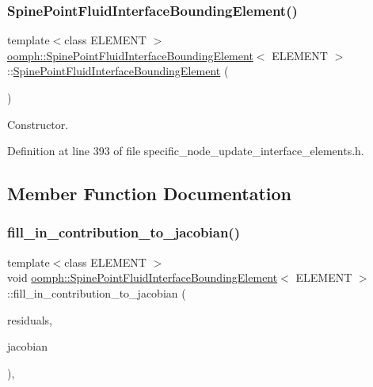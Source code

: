 \subsubsection{\texorpdfstring{Spine\+Point\+Fluid\+Interface\+Bounding\+Element()}{SpinePointFluidInterfaceBoundingElement()}}
{\footnotesize\ttfamily template$<$class E\+L\+E\+M\+E\+NT $>$ \\
\hyperlink{classoomph_1_1SpinePointFluidInterfaceBoundingElement}{oomph\+::\+Spine\+Point\+Fluid\+Interface\+Bounding\+Element}$<$ E\+L\+E\+M\+E\+NT $>$\+::\hyperlink{classoomph_1_1SpinePointFluidInterfaceBoundingElement}{Spine\+Point\+Fluid\+Interface\+Bounding\+Element} (\begin{DoxyParamCaption}{ }\end{DoxyParamCaption})\hspace{0.3cm}{\ttfamily [inline]}}



Constructor. 



Definition at line 393 of file specific\+\_\+node\+\_\+update\+\_\+interface\+\_\+elements.\+h.



\subsection{Member Function Documentation}
\mbox{\label{classoomph_1_1SpinePointFluidInterfaceBoundingElement_afe714a2a2b9f741558376cc144e19232}} 
\subsubsection{\texorpdfstring{fill\+\_\+in\+\_\+contribution\+\_\+to\+\_\+jacobian()}{fill\_in\_contribution\_to\_jacobian()}}
{\footnotesize\ttfamily template$<$class E\+L\+E\+M\+E\+NT $>$ \\
void \hyperlink{classoomph_1_1SpinePointFluidInterfaceBoundingElement}{oomph\+::\+Spine\+Point\+Fluid\+Interface\+Bounding\+Element}$<$ E\+L\+E\+M\+E\+NT $>$\+::fill\+\_\+in\+\_\+contribution\+\_\+to\+\_\+jacobian (\begin{DoxyParamCaption}\item[{\hyperlink{classoomph_1_1Vector}{Vector}$<$ double $>$ \&}]{residuals,  }\item[{\hyperlink{classoomph_1_1DenseMatrix}{Dense\+Matrix}$<$ double $>$ \&}]{jacobian }\end{DoxyParamCaption})\hspace{0.3cm}{\ttfamily [inline]}, {\ttfamily [virtual]}}



